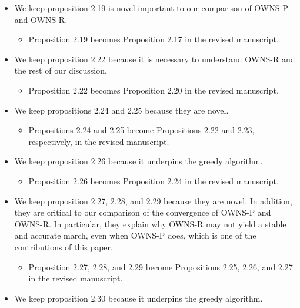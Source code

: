 \documentclass{article}
\begin{document}
\begin{enumerate}
{\begin{itemize}
        \begin{itemize}
            \item Proposition 2.17 becomes Proposition 2.15 in the revised manuscript.
        \end{itemize}
        \item We keep proposition 2.19 is novel important to our comparison of OWNS-P and OWNS-R.
        \begin{itemize}
            \item Proposition 2.19 becomes Proposition 2.17 in the revised manuscript.
        \end{itemize}
        \item We keep proposition 2.22 because it is necessary to understand OWNS-R and the rest of our discussion.
        \begin{itemize}
            \item Proposition 2.22 becomes Proposition 2.20 in the revised manuscript.
        \end{itemize}
        \item We keep propositions 2.24 and 2.25 because they are novel.
        \begin{itemize}
            \item Propositions 2.24 and 2.25 become Propositions 2.22 and 2.23, respectively, in the revised manuscript.
        \end{itemize}
        \item We keep proposition 2.26 because it underpins the greedy algorithm.
        \begin{itemize}
            \item Proposition 2.26 becomes Proposition 2.24 in the revised manuscript.
        \end{itemize}
        \item We keep proposition 2.27, 2.28, and 2.29 because they are novel. In addition, they are critical to our comparison of the convergence of OWNS-P and OWNS-R. In particular, they explain why OWNS-R may not yield a stable and accurate march, even when OWNS-P does, which is one of the contributions of this paper.
        \begin{itemize}
            \item Proposition 2.27, 2.28, and 2.29 become Propositions 2.25, 2.26, and 2.27 in the revised manuscript.
        \end{itemize}
        \item We keep proposition 2.30 because it underpins the greedy algorithm.
        \begin{itemize}

\end{itemize}
\end{itemize}}
\end{enumerate}
\end{document}
